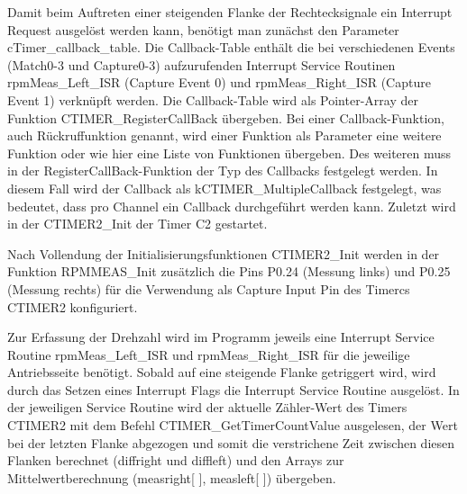 Damit beim Auftreten einer steigenden Flanke der Rechtecksignale ein Interrupt Request ausgelöst werden kann, benötigt man zunächst den Parameter cTimer\_callback\_table. Die Callback-Table enthält die bei verschiedenen Events (Match0-3 und Capture0-3) aufzurufenden Interrupt Service Routinen rpmMeas\_Left\_ISR (Capture Event 0) und rpmMeas\_Right\_ISR (Capture Event 1) verknüpft werden. Die Callback-Table wird als Pointer-Array der Funktion CTIMER\_RegisterCallBack übergeben. Bei einer Callback-Funktion, auch Rückruffunktion genannt, wird einer Funktion als Parameter eine weitere Funktion oder wie hier eine Liste von Funktionen übergeben. Des weiteren muss in der RegisterCallBack-Funktion der Typ des Callbacks festgelegt werden. In diesem Fall wird der Callback als \glqq{}kCTIMER\_MultipleCallback\grqq{} festgelegt, was bedeutet, dass pro Channel ein Callback durchgeführt werden kann. Zuletzt wird in der CTIMER2\_Init der Timer C2 gestartet.\vspace{11pt}

Nach Vollendung der Initialisierungsfunktionen CTIMER2\_Init werden in der Funktion RPMMEAS\_Init zusätzlich die Pins P0.24 (Messung links) und P0.25 (Messung rechts) für die Verwendung als Capture Input Pin des Timercs CTIMER2 konfiguriert.\vspace{11pt}

Zur Erfassung der Drehzahl wird im Programm jeweils eine Interrupt Service Routine rpmMeas\_Left\_ISR und rpmMeas\_Right\_ISR für die jeweilige Antriebsseite benötigt. Sobald auf eine steigende Flanke getriggert wird, wird durch das Setzen eines Interrupt Flags die Interrupt Service Routine ausgelöst. In der jeweiligen Service Routine wird der aktuelle Zähler-Wert des Timers CTIMER2 mit dem Befehl CTIMER\_GetTimerCountValue ausgelesen, der Wert bei der letzten Flanke abgezogen und somit die verstrichene Zeit zwischen diesen Flanken berechnet (diffright und diffleft) und den Arrays zur Mittelwertberechnung (measright[ ], measleft[ ]) übergeben.  

